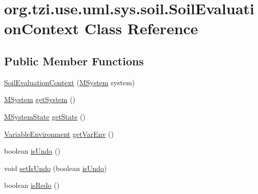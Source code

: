 \hypertarget{classorg_1_1tzi_1_1use_1_1uml_1_1sys_1_1soil_1_1_soil_evaluation_context}{\section{org.\-tzi.\-use.\-uml.\-sys.\-soil.\-Soil\-Evaluation\-Context Class Reference}
\label{classorg_1_1tzi_1_1use_1_1uml_1_1sys_1_1soil_1_1_soil_evaluation_context}
}
\subsection*{Public Member Functions}
\begin{DoxyCompactItemize}
\item 
\hyperlink{classorg_1_1tzi_1_1use_1_1uml_1_1sys_1_1soil_1_1_soil_evaluation_context_ae63652d1a11ffce84ae9fc9e2def5fe3}{Soil\-Evaluation\-Context} (\hyperlink{classorg_1_1tzi_1_1use_1_1uml_1_1sys_1_1_m_system}{M\-System} system)
\item 
\hyperlink{classorg_1_1tzi_1_1use_1_1uml_1_1sys_1_1_m_system}{M\-System} \hyperlink{classorg_1_1tzi_1_1use_1_1uml_1_1sys_1_1soil_1_1_soil_evaluation_context_acceeda45a502b3d7b2cd9a1d2049fffe}{get\-System} ()
\item 
\hyperlink{classorg_1_1tzi_1_1use_1_1uml_1_1sys_1_1_m_system_state}{M\-System\-State} \hyperlink{classorg_1_1tzi_1_1use_1_1uml_1_1sys_1_1soil_1_1_soil_evaluation_context_afb5502df19cb1c1999091bc0ea9e81c9}{get\-State} ()
\item 
\hyperlink{classorg_1_1tzi_1_1use_1_1util_1_1soil_1_1_variable_environment}{Variable\-Environment} \hyperlink{classorg_1_1tzi_1_1use_1_1uml_1_1sys_1_1soil_1_1_soil_evaluation_context_a4e4489f99b81cae644a602015d52daf0}{get\-Var\-Env} ()
\item 
boolean \hyperlink{classorg_1_1tzi_1_1use_1_1uml_1_1sys_1_1soil_1_1_soil_evaluation_context_a43b742a539c18d5fac2a5624ffed5bdd}{is\-Undo} ()
\item 
void \hyperlink{classorg_1_1tzi_1_1use_1_1uml_1_1sys_1_1soil_1_1_soil_evaluation_context_aabe4a1e9ed062844d32c8b03617c80b5}{set\-Is\-Undo} (boolean \hyperlink{classorg_1_1tzi_1_1use_1_1uml_1_1sys_1_1soil_1_1_soil_evaluation_context_a43b742a539c18d5fac2a5624ffed5bdd}{is\-Undo})
\item 
boolean \hyperlink{classorg_1_1tzi_1_1use_1_1uml_1_1sys_1_1soil_1_1_soil_evaluation_context_a59dc582118f6195ce909ba7e4127f7e2}{is\-Redo} ()
\item 

\end{DoxyCompactItemize}

